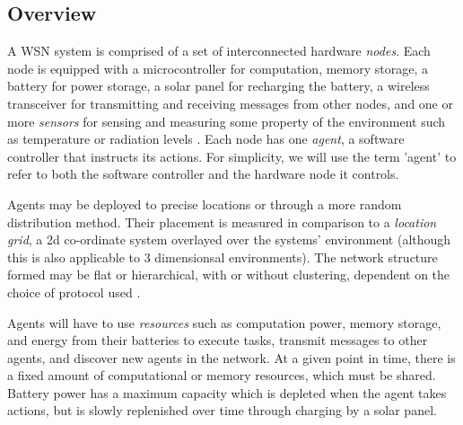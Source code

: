 \subsection{Overview}
\label{problem_overview}
A WSN system is comprised of a set of interconnected hardware \textit{nodes}. Each node is equipped with a microcontroller for computation, memory storage, a battery for power storage, a solar panel for recharging the battery, a wireless transceiver for  transmitting and receiving messages from other nodes, and one or more \textit{sensors} for sensing and measuring some property of the environment such as temperature or radiation levels \citep{muhammad_r_ahmed_2012_1072589}. Each node has one \textit{agent}, a software controller that instructs its actions. For simplicity, we will use the term 'agent' to refer to both the software controller and the hardware node it controls. 

Agents may be deployed to precise locations or through a more random distribution method. Their placement is measured in comparison to a \textit{location grid}, a 2d co-ordinate system overlayed over the systems' environment (although this is also applicable to 3 dimensionsal environments).  The network structure formed may be flat or hierarchical, with or without clustering, dependent on the choice of protocol used \citep{Carlos-Mancilla2016b}. 

Agents will have to use \textit{resources} such as computation power, memory storage, and energy from their batteries to execute tasks, transmit messages to other agents, and discover new agents in the network. At a given point in time, there is a fixed amount of computational or memory resources, which must be shared. Battery power has a maximum capacity which is depleted when the agent takes actions, but is slowly replenished over time through charging by a solar panel.  

